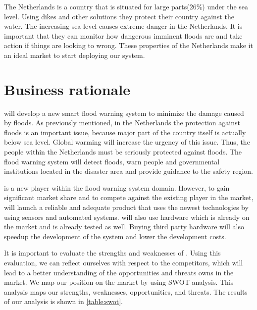 The Netherlands is a country that is situated for large parts(26\%) under the sea level\cite{holland}. Using dikes and other solutions they protect their country against the water. The increasing sea level causes extreme danger in the Netherlands. It is important that they can monitor how dangerous imminent floods are and take action if things are looking to wrong. These properties of the Netherlands make it an ideal market to start deploying our system. %

\section{Business rationale}
\CompanyName{} will develop a new smart flood warning system to minimize the damage caused by floods. As previously mentioned, in the Netherlands the protection against floods is an important issue, because major part of the country itself is actually below sea level. Global warming will increase the urgency of this issue. Thus, the people within the Netherlands must be seriously protected against floods. The flood warning system will detect floods, warn people and governmental institutions located in the disaster area and provide guidance to the safety region.


\CompanyName{} is a new player within the flood warning system domain. However, to gain significant market share and to compete against the existing player in the market, \CompanyName{} will launch a reliable and adequate product that uses the newest technologies by using sensors and automated systems. \CompanyName{} will also use hardware which is already on the market and is already tested as well. Buying third party hardware will also speedup the development of the system and lower the development costs.

It is important to evaluate the strengths and weaknesses of \CompanyName{}. Using this evaluation, we can reflect ourselves with respect to the competitors, which will lead to a better understanding of the opportunities and threats \CompanyName{} owns in the market. We map our position on the market by using SWOT-analysis. This analysis maps our strengths, weaknesses, opportunities, and threats. The results of our analysis is shown in \autoref{table:swot}.

